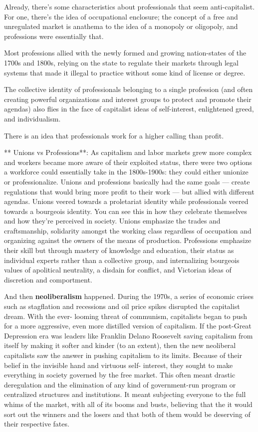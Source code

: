 \documentclass[
]{book}
\begin{document}
Already, there's some characteristics about professionals that
seem anti-capitalist. For one, there's the idea of occupational
enclosure; the concept of a free and unregulated market is
anathema to the idea of a monopoly or oligopoly, and
professions were essentially that.

Most professions allied with
the newly formed and growing nation-states of the 1700s and
1800s, relying on the state to regulate their markets through
legal systems that made it illegal to practice without some
kind of license or degree.

The collective identity of
professionals belonging to a single profession (and often
creating powerful organizations and interest groups to
protect and promote their agendas) also flies in the face of
capitalist ideas of self-interest, enlightened greed, and
individualism.

There is an idea that professionals work for a higher calling
than profit.

** Unions vs Professions**: As capitalism and labor markets grew more complex and workers became more aware of their exploited status, there were two options a workforce could essentially take in the 1800s-1900s: they could either unionize or professionalize. Unions and professions basically had the same goals --- create regulations that would bring more profit to their work --- but allied with different agendas. Unions veered towards a proletariat identity while professionals veered towards a bourgeois identity. You can see this in how they celebrate themselves and how they're perceived in society. Unions emphasize the trades and craftsmanship, solidarity amongst the working class regardless of occupation and organizing against the owners of the means of production. Professions emphasize their skill but through mastery of knowledge and education, their status as individual experts rather than a collective group, and internalizing bourgeois values of apolitical neutrality, a disdain for conflict, and Victorian ideas of discretion and comportment.

And then \textbf{neoliberalism} happened. During the 1970s, a series
of economic crises such as stagflation and recessions and oil
price spikes disrupted the capitalist dream. With the ever-
looming threat of communism, capitalists began to push for a
more aggressive, even more distilled version of capitalism. If
the post-Great Depression era was leaders like Franklin
Delano Roosevelt saving capitalism from itself by making it
softer and kinder (to an extent), then the new neoliberal
capitalists saw the answer in pushing capitalism to its limits.
Because of their belief in the invisible hand and virtuous self-
interest, they sought to make everything in society governed
by the free market. This often meant drastic deregulation and
the elimination of any kind of government-run program or
centralized structures and institutions. It meant subjecting
everyone to the full whims of the market, with all of its
booms and busts, believing that the it would sort out the
winners and the losers and that both of them would be
deserving of their respective fates.
\end{document}
